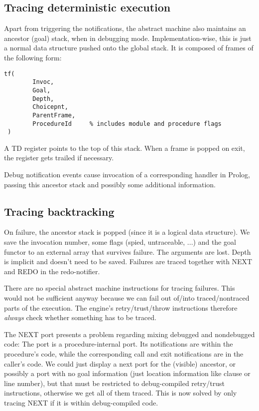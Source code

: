 \subsection{Tracing deterministic execution}

Apart from triggering the notifications, the abstract machine also
maintains an ancestor (goal) stack, when in debugging mode. 
Implementation-wise, this is just a normal data structure pushed onto
the global stack.  It is composed of frames of the following form:
\begin{verbatim}
tf(
        Invoc,
        Goal,
        Depth,
        Choicepnt,
        ParentFrame,
        ProcedureId     % includes module and procedure flags
 )
\end{verbatim}

A TD register points to the top of this stack. When a frame is popped
on exit, the register gets trailed if necessary.

Debug notification events cause invocation of a corresponding handler
in Prolog, passing this ancestor stack and possibly some additional
information.


\subsection{Tracing backtracking}

On failure, the ancestor stack is popped (since it is a logical data
structure).  We save the invocation number, some flags (spied,
untraceable, ...) and the goal functor to an external array that
survives failure.  The arguments are lost.  Depth is implicit and
doesn't need to be saved.  Failures are traced together with NEXT and
REDO in the redo-notifier.

There are no special abstract machine instructions for tracing failures.
This would not be sufficient anyway because we can fail out of/into
traced/nontraced parts of the execution. The engine's retry/trust/throw
instructions therefore {\em always} check whether something has to be traced.

The NEXT port presents a problem regarding mixing debugged and
nondebugged code:  The port is a procedure-internal port.  Its
notifications are within the procedure's code, while the corresponding
call and exit notifications are in the caller's code.  We could just
display a next port for the (visible) ancestor, or possibly a port
with no goal information (just location information like clause or
line number), but that must be restricted to debug-compiled
retry/trust instructions, otherwise we get all of them traced.  This
is now solved by only tracing NEXT if it is within debug-compiled code.

